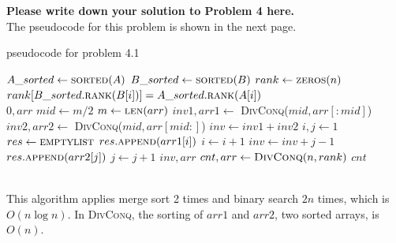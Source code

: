 \documentclass[11pt,twoside]{article}
\newenvironment{solution}{{\par\noindent\it Solution.}}{}
\begin{document}
\begin{solution}
\textbf{Please write down your solution to Problem 4 here.}\\
The pseudocode for this problem is shown in the next page.\\
\begin{algorithm}
    \caption{pseudocode for problem 4.1}
    \begin{algorithmic}
            \State $A\_sorted \gets \textsc{sorted}(A)$ 
            \State $B\_sorted \gets \textsc{sorted}(B)$ 
            \State $rank \gets \textsc{zeros}(n)$ 
                \State $rank[B\_sorted.\textsc{rank}(B[i])]=A\_sorted.\textsc{rank}(A[i])$\\
            \EndFor
                    \State \Return $0, arr$
                \EndIf
                \State $mid \gets m/2$
                \State $m \gets \textsc{len}(arr)$
                \State $inv1, arr1 \gets$ \textsc{DivConq}($mid, arr[:mid]$)
                \State $inv2, arr2 \gets$ \textsc{DivConq}($mid, arr[mid:]$)
                \State $inv \gets inv1+inv2$
                \State $i,j \gets 1$
                \State $res \gets \textsc{emptylist}$
                        \State $res.\textsc{append}(arr1[i])$
                        \State $i \gets i+1$
                        \State $inv \gets inv+j-1$
                    \Else
                        \State $res.\textsc{append}(arr2[j])$
                        \State $j \gets j+1$
                    \EndIf
                \EndWhile
                \State \Return $inv, arr$
            \EndProcedure
            \State $cnt, arr \gets \textsc{DivConq}(n, rank)$
            \State \Return $cnt$
        \EndProcedure     
    \end{algorithmic}
\end{algorithm}\\
This algorithm applies merge sort 2 times and binary search $2n$ times, which is $O(n\log{n})$.
In \textsc{DivConq}, the sorting of $arr1$ and $arr2$, two sorted arrays, is $O(n)$. 

\end{solution}
\end{document}
